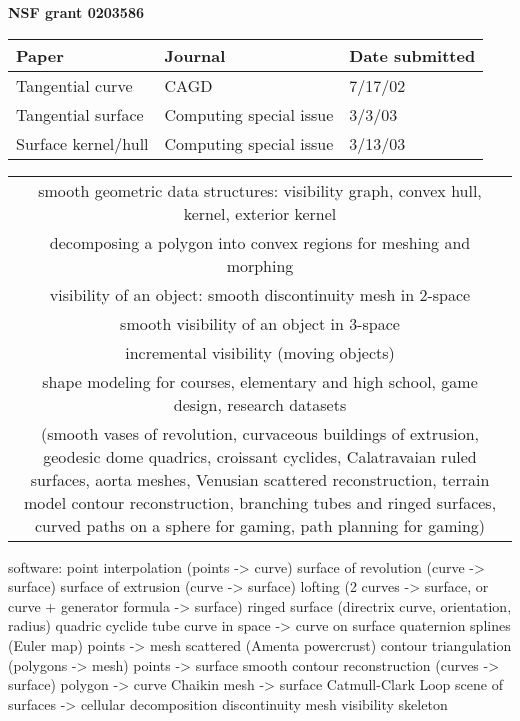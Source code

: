 \documentclass[12pt]{article}
\begin{document}
\centerline{{\bf NSF grant 0203586}}

\begin{table}[h]
\begin{tabular}{lll}
Paper & Journal & Date submitted \\ \hline 
Tangential curve & CAGD & 7/17/02 \\
Tangential surface & Computing special issue & 3/3/03 \\
Surface kernel/hull & Computing special issue & 3/13/03 \\
\end{tabular}
\end{table}

\begin{table}[h]
\begin{tabular}{c}
smooth geometric data structures: visibility graph, convex hull, kernel, exterior kernel \\
decomposing a polygon into convex regions for meshing and morphing \\
visibility of an object: smooth discontinuity mesh in 2-space \\
smooth visibility of an object in 3-space \\
incremental visibility (moving objects) \\
shape modeling for courses, elementary and high school, game design, research datasets \\
(smooth vases of revolution, curvaceous buildings of extrusion, geodesic dome quadrics, croissant cyclides, Calatravaian ruled surfaces, aorta meshes, Venusian scattered reconstruction, terrain model contour reconstruction, branching tubes and ringed surfaces, curved paths on a sphere for gaming, path planning for gaming)\\
\end{tabular}
\end{table}

software: point interpolation (points -> curve)
              surface of revolution (curve -> surface)
	      surface of extrusion  (curve -> surface)
	      lofting (2 curves -> surface, or curve + generator formula -> surface)
	  ringed surface (directrix curve, orientation, radius)
	      quadric
	      cyclide
	      tube
	  curve in space -> curve on surface
	      quaternion splines (Euler map)
          points -> mesh
	      scattered (Amenta powercrust)
	      contour triangulation (polygons -> mesh)
	  points -> surface
	      smooth contour reconstruction (curves -> surface)
	  polygon -> curve
	      Chaikin
	  mesh -> surface
	      Catmull-Clark
	      Loop
	  scene of surfaces -> cellular decomposition
	      discontinuity mesh
	      visibility skeleton
\end{document}

